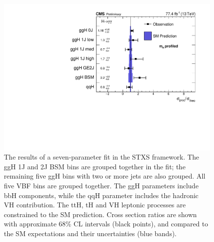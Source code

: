 {\begin{figure}[hptb]
\centering
\includegraphics[width=\textwidth]{Figures/Results/Stage1.pdf}
\caption{
  The results of a seven-parameter fit in the STXS framework. 
  The ggH 1J and 2J BSM bins are grouped together in the fit; 
  the remaining five ggH bins with two or more jets are also grouped. 
  All five VBF bins are grouped together. 
  The ggH parameters include bbH components, 
  while the qqH parameter includes the hadronic VH contribution. 
  The ttH, tH and VH leptonic processes are constrained to the SM prediction. 
  Cross section ratios are shown with approximate 68\% CL intervals (black points), 
  and compared to the SM expectations and their uncertainties (blue bands).
}
\label{fig:results_Stage1}
\end{figure}


}
